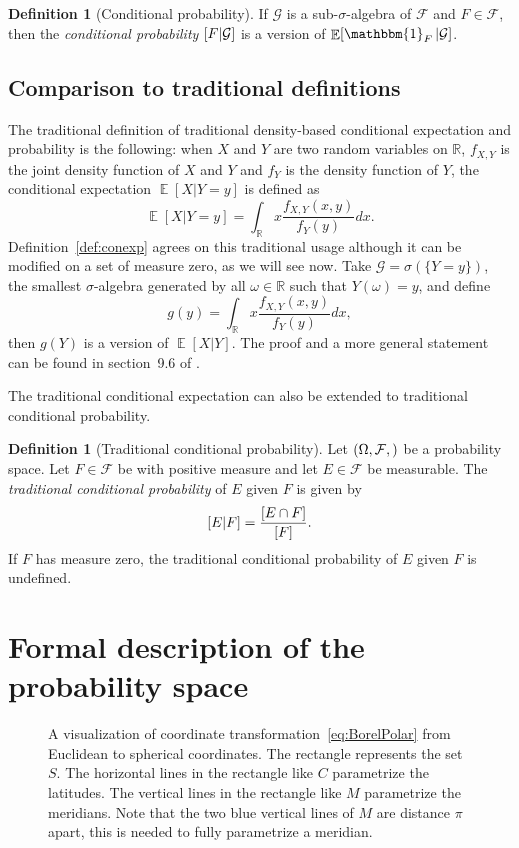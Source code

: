 \documentclass[a4paper]{report}
\theoremstyle{plain}
\theoremstyle{definition}
\newtheorem{definition}[theorem]{Definition}
\theoremstyle{remark}
\numberwithin{equation}{chapter}
\newcommand{\R}{\mathbb{R}}
\let\P\relax
\DeclareMathOperator{\P}{\mathbb{P}}
\DeclareMathOperator{\E}{\mathbb{E}}
\DeclareMathOperator{\1}{\mathbbm{1}}
\newcommand{\F}{\mathcal{F}}
\renewcommand{\G}{\mathcal{G}}
\begin{document}
\begin{definition}[Conditional probability]
If $\G$ is a sub-$\sigma$-algebra of $\F$ and $F\in\F$, then the \emph{conditional probability} $\P[F|\G]$ is a version of $\E[\1_F|\G]$.
\end{definition}

\subsection{Comparison to traditional definitions}
The traditional definition of traditional density-based conditional expectation and probability is the following: when $X$ and $Y$ are two random variables on $\R$, $f_{X,Y}$ is the joint density function of $X$ and $Y$ and $f_Y$ is the density function of $Y$, the conditional expectation $\E[X|Y=y]$ is defined as
\begin{equation}
\E[X|Y=y]=\int_\R x\frac{f_{X,Y}(x,y)}{f_Y(y)}dx.
\end{equation}
Definition~\ref{def:conexp} agrees on this traditional usage although it can be modified on a set of measure zero, as we will see now. Take $\G=\sigma(\{Y=y\})$, the smallest $\sigma$-algebra generated by all $\omega\in\R$ such that $Y(\omega)=y$, and define
\begin{equation}
g(y)=\int_\R x\frac{f_{X,Y}(x,y)}{f_Y(y)}dx,
\end{equation}
then $g(Y)$ is a version of $\E[X|Y]$. The proof and a more general statement can be found in section~9.6 of \cite{Williams91}.

The traditional conditional expectation can also be extended to traditional conditional probability.
\begin{definition}[Traditional conditional probability]
Let $(\Omega,\F, \P)$ be a probability space. Let $F\in\F$ be with positive measure and let $E\in\F$ be measurable. The \emph{traditional conditional probability} of $E$ given $F$ is given by
\begin{equation}
\P[E|F]=\frac{\P[E\cap F]}{\P[F]}.
\end{equation}
If $F$ has measure zero, the traditional conditional probability of $E$ given $F$ is undefined.
\end{definition}

\section{Formal description of the probability space}
\begin{figure}
\centering{

}
\caption{A visualization of coordinate transformation~\eqref{eq:BorelPolar} from Euclidean to spherical coordinates. The rectangle represents the set $S$. The horizontal lines in the rectangle like $C$ parametrize the latitudes. The vertical lines in the rectangle like $M$ parametrize the meridians. Note that the two blue vertical lines of $M$ are distance $\pi$ apart, this is needed to fully parametrize a meridian.}
\label{fig:BorelVis}
\end{figure}
\end{document}
